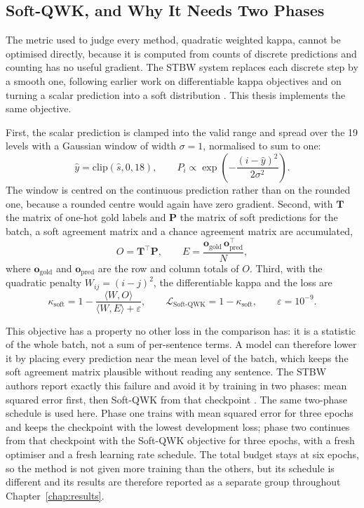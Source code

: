 \subsection{Soft-QWK, and Why It Needs Two Phases}

The metric used to judge every method, quadratic weighted kappa, cannot be optimised directly,
because it is computed from counts of discrete predictions and counting has no useful gradient.
The STBW system \cite{trigui2025stbw} replaces each discrete step by a smooth one, following
earlier work on differentiable kappa objectives \cite{delatorre2018wkl} and on turning a scalar
prediction into a soft distribution \cite{diaz2019softlabels}. This thesis implements the same
objective.

First, the scalar prediction is clamped into the valid range and spread over the 19 levels with
a Gaussian window of width $\sigma=1$, normalised to sum to one:
\begin{equation}
\hat{y} = \mathrm{clip}(\hat{s},0,18), \qquad
P_i \propto \exp\left(-\frac{(i-\hat{y})^2}{2\sigma^2}\right) .
\end{equation}
The window is centred on the continuous prediction rather than on the rounded one, because a
rounded centre would again have zero gradient. Second, with $\mathbf{T}$ the matrix of one-hot
gold labels and $\mathbf{P}$ the matrix of soft predictions for the batch, a soft agreement
matrix and a chance agreement matrix are accumulated,
\begin{equation}
O = \mathbf{T}^{\top}\mathbf{P}, \qquad
E = \frac{\mathbf{o}_{\text{gold}}\,\mathbf{o}_{\text{pred}}^{\top}}{N},
\end{equation}
where $\mathbf{o}_{\text{gold}}$ and $\mathbf{o}_{\text{pred}}$ are the row and column totals
of $O$. Third, with the quadratic penalty $W_{ij}=(i-j)^2$, the differentiable kappa and the
loss are
\begin{equation}
\kappa_{\text{soft}} = 1 - \frac{\langle W,O\rangle}{\langle W,E\rangle + \varepsilon},
\qquad
\mathcal{L}_{\text{Soft-QWK}} = 1-\kappa_{\text{soft}},
\qquad \varepsilon = 10^{-9}.
\end{equation}

This objective has a property no other loss in the comparison has: it is a statistic of the
whole batch, not a sum of per-sentence terms. A model can therefore lower it by placing every
prediction near the mean level of the batch, which keeps the soft agreement matrix plausible
without reading any sentence. The STBW authors report exactly this failure and avoid it by
training in two phases: mean squared error first, then Soft-QWK from that checkpoint
\cite{trigui2025stbw}. The same two-phase schedule is used here. Phase one trains with mean
squared error for three epochs and keeps the checkpoint with the lowest development loss; phase
two continues from that checkpoint with the Soft-QWK objective for three epochs, with a fresh
optimiser and a fresh learning rate schedule. The total budget stays at six epochs, so the
method is not given more training than the others, but its schedule is different and its
results are therefore reported as a separate group throughout Chapter~\ref{chap:results}.

